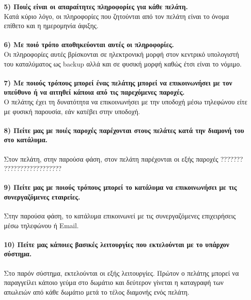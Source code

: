 \noindent
\textbf{5) Ποιές είναι οι απαραίτητες πληροφορίες για κάθε πελάτη.} \\
\noindent
Κατά κύριο λόγο, οι πληροφορίες που ζητούνται από τον πελάτη είναι 
το όνομα επίθετο και η ημερομηνία άφιξης. \\ \\

\noindent
\textbf{6) Με ποιό τρόπο αποθηκεύονται αυτές οι πληροφορίες.} \\
\noindent
Οι πληροφορίες αυτές βρίσκονται σε ηλεκτρονική μορφή στον κεντρικό υπολογιστή
του καταλύματος ως backup αλλά και σε φυσική μορφή καθώς έτσι είναι το νόμιμο. \\ \\

\noindent
\textbf{7) Με ποιούς τρόπους μπορεί ένας πελάτης μπορεί  να επικοινωνήσει 
	με τον υπεύθυνο ή να αιτηθεί κάποια από τις παρεχόμενες παροχές.} \\
\noindent
Ο πελάτης έχει τη δυνατότητα να επικοινωνήσει με την υποδοχή μέσω τηλεφώνου
είτε με φυσική παρουσία, εάν κατέβει στην υποδοχή.\\ \\

\noindent
\textbf{8) Πείτε μας με ποιές παροχές παρέχονται στους πελάτες κατά την διαμονή 
	του στο κατάλυμα.} \\ \\
\noindent
Στον πελάτη, στην παρούσα φάση, στον πελάτη παρέχονται οι εξής παροχές ???????
?????????????????? \\ \\

\noindent
\textbf{9) Πείτε μας με ποιούς τρόπους μπορεί το κατάλυμα να επικοινωνήσει με τις 
	συνεργαζόμενες εταιρείες.} \\ \\
\noindent
Στην παρούσα φάση, το κατάλυμα επικοινωνεί με τις συνεργαζόμενες επιχειρήσεις
μέσω τηλεφώνου ή Email.\\ \\

\noindent
\textbf{10) Πείτε μας κάποιες βασικές λειτουργίες που εκτελούνται με το υπάρχον 
	σύστημα.}\\ \\
Στο παρόν σύστημα, εκτελούνται οι εξής λειτουργίες. Πρώτον ο πελάτης μπορεί να
παραγγείλει κάποιο γεύμα στο δωμάτιο και δεύτερον γίνεται η καταγραφή των 
απωλειών από κάθε δωμάτιο μετά το τέλος διαμονής ενός πελάτη.\\ \\ 

